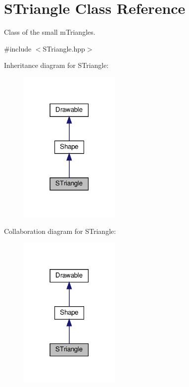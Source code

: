 \hypertarget{classSTriangle}{}\section{S\+Triangle Class Reference}
\label{classSTriangle}


Class of the small mTriangles.




{\ttfamily \#include $<$S\+Triangle.\+hpp$>$}



Inheritance diagram for S\+Triangle\+:\nopagebreak
\begin{figure}[H]
\begin{center}
\leavevmode
\includegraphics[width=138pt]{classSTriangle__inherit__graph}
\end{center}
\end{figure}


Collaboration diagram for S\+Triangle\+:\nopagebreak
\begin{figure}[H]
\begin{center}
\leavevmode
\includegraphics[width=138pt]{classSTriangle__coll__graph}
\end{center}
\end{figure}
